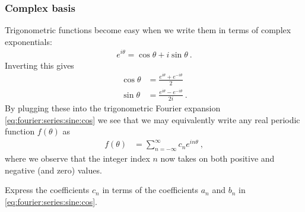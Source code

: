 \documentclass[12pt, oneside]{report}    %
\begin{document}
\subsubsection{Complex basis}
Trigonometric functions become easy when we write them in terms of complex exponentials:
\begin{align}
    e^{i\theta} = \cos\theta + i \sin\theta \ .
\end{align}
Inverting this gives
\begin{align}
    \cos\theta &= \frac{e^{i\theta} + e^{-i\theta}}{2}
    \\
    \sin\theta &= \frac{e^{i\theta} - e^{-i\theta}}{2i} 
    \ .
\end{align}
By plugging these into the trigonometric Fourier expansion \eqref{eq:fourier:series:sine:cos} we see that we may equivalently write any real periodic function $f(\theta)$ as
\begin{align}
    f(\theta) &= \sum_{n=-\infty}^\infty
    c_n e^{in\theta} \ ,
    \label{eq:fourier:complex:series}
\end{align}
where we observe that the integer index $n$ now takes on both positive and negative (and zero) values. 
\begin{exercise}
Express the coefficients $c_n$ in terms of the coefficients $a_n$ and $b_n$ in  \eqref{eq:fourier:series:sine:cos}.
\end{exercise}
\end{document}
